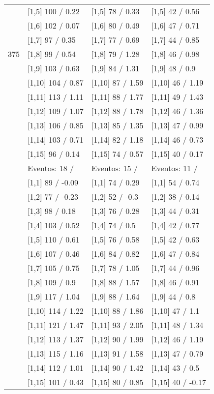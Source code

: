 \begin{table}
\begin{tabular}[t]{llll}
 & {}[1,5] 100  / 0.22 & {}[1,5] 78  / 0.33 & {}[1,5] 42  / 0.56\\
 & {}[1,6] 102  / 0.07 & {}[1,6] 80  / 0.49 & {}[1,6] 47  / 0.71\\
 & {}[1,7] 97  / 0.35 & {}[1,7] 77  / 0.69 & {}[1,7] 44  / 0.85\\
375 & {}[1,8] 99  / 0.54 & {}[1,8] 79  / 1.28 & {}[1,8] 46  / 0.98\\
\addlinespace
 & {}[1,9] 103  / 0.63 & {}[1,9] 84  / 1.31 & {}[1,9] 48  / 0.9\\
 & {}[1,10] 104  / 0.87 & {}[1,10] 87  / 1.59 & {}[1,10] 46  / 1.19\\
 & {}[1,11] 113  / 1.11 & {}[1,11] 88  / 1.77 & {}[1,11] 49  / 1.43\\
 & {}[1,12] 109  / 1.07 & {}[1,12] 88  / 1.78 & {}[1,12] 46  / 1.36\\
 & {}[1,13] 106  / 0.85 & {}[1,13] 85  / 1.35 & {}[1,13] 47  / 0.99\\
\addlinespace
 & {}[1,14] 103  / 0.71 & {}[1,14] 82  / 1.18 & {}[1,14] 46  / 0.73\\
 & {}[1,15] 96  / 0.14 & {}[1,15] 74  / 0.57 & {}[1,15] 40  / 0.17\\
 & Eventos:  18 / & Eventos:  15 / & Eventos:  11 /\\
 & {}[1,1] 89  / -0.09 & {}[1,1] 74  / 0.29 & {}[1,1] 54  / 0.74\\
 & {}[1,2] 77  / -0.23 & {}[1,2] 52  / -0.3 & {}[1,2] 38  / 0.14\\
\addlinespace
 & {}[1,3] 98  / 0.18 & {}[1,3] 76  / 0.28 & {}[1,3] 44  / 0.31\\
 & {}[1,4] 103  / 0.52 & {}[1,4] 74  / 0.5 & {}[1,4] 42  / 0.77\\
 & {}[1,5] 110  / 0.61 & {}[1,5] 76  / 0.58 & {}[1,5] 42  / 0.63\\
 & {}[1,6] 107  / 0.46 & {}[1,6] 84  / 0.82 & {}[1,6] 47  / 0.84\\
 & {}[1,7] 105  / 0.75 & {}[1,7] 78  / 1.05 & {}[1,7] 44  / 0.96\\
\addlinespace
500 & {}[1,8] 109  / 0.9 & {}[1,8] 88  / 1.57 & {}[1,8] 46  / 0.91\\
 & {}[1,9] 117  / 1.04 & {}[1,9] 88  / 1.64 & {}[1,9] 44  / 0.8\\
 & {}[1,10] 114  / 1.22 & {}[1,10] 88  / 1.86 & {}[1,10] 47  / 1.1\\
 & {}[1,11] 121  / 1.47 & {}[1,11] 93  / 2.05 & {}[1,11] 48  / 1.34\\
 & {}[1,12] 113  / 1.37 & {}[1,12] 90  / 1.99 & {}[1,12] 46  / 1.19\\
\addlinespace
 & {}[1,13] 115  / 1.16 & {}[1,13] 91  / 1.58 & {}[1,13] 47  / 0.79\\
 & {}[1,14] 112  / 1.01 & {}[1,14] 90  / 1.42 & {}[1,14] 43  / 0.5\\
 & {}[1,15] 101  / 0.43 & {}[1,15] 80  / 0.85 & {}[1,15] 40  / -0.17\\
\bottomrule
\end{tabular}
\end{table}
